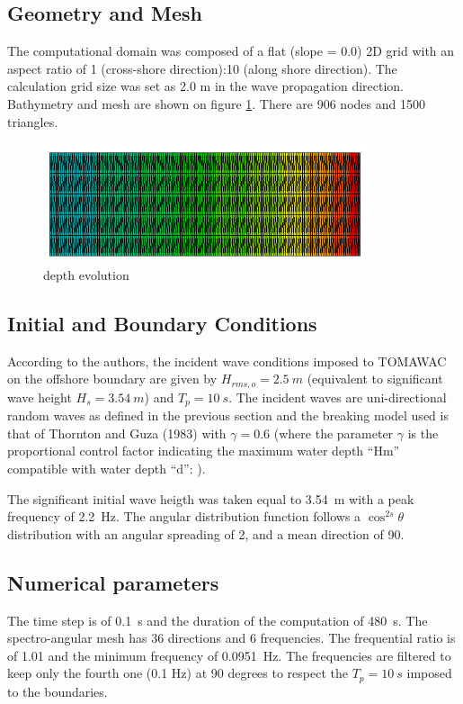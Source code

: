 \subsection{Geometry and Mesh}
%
The computational domain was composed of a flat (slope = 0.0) 2D grid with an aspect ratio of 1 (cross-shore direction):10 (along shore direction). The calculation grid size was set as 2.0 m in the wave propagation direction.
Bathymetry and mesh are shown on figure \ref{bathydean}. There are 906 nodes and 1500 triangles.
\begin{figure} [!h]
\centering
\includegraphics[width=0.85\textwidth]{bathy.png}
 \caption{depth evolution}
\label{bathydean}
\end{figure}

\subsection{Initial and Boundary Conditions}
%
According to the authors, the incident wave conditions imposed to TOMA\-WAC on the offshore boundary are given by $H_{rms,o} = 2.5~m$ (equivalent to significant wave height $H_s = 3.54~m$) and $T_p = 10~s$.
The incident waves are uni-directional random waves as defined in the previous section and the breaking model used is that of Thornton and Guza (1983) with  $\gamma=0.6$ (where the parameter $\gamma$  is the proportional control factor indicating the maximum water depth “Hm” compatible with water depth “d”: ).

The significant initial wave heigth was taken equal to 3.54~m with a peak frequency of 2.2~Hz. The angular distribution function follows a $\cos^{2s} \theta$ distribution with an angular spreading of 2, and a mean direction of 90.

\subsection{Numerical parameters}
%
The time step is of 0.1~s and the duration of the computation of 480~s. The spectro-angular mesh has 36 directions and 6 frequencies. The frequential ratio is of 1.01 and the minimum frequency of 0.0951~Hz. The frequencies are filtered to keep only the fourth one (0.1 Hz) at 90 degrees to respect the $T_p= 10~s$ imposed to the boundaries.

